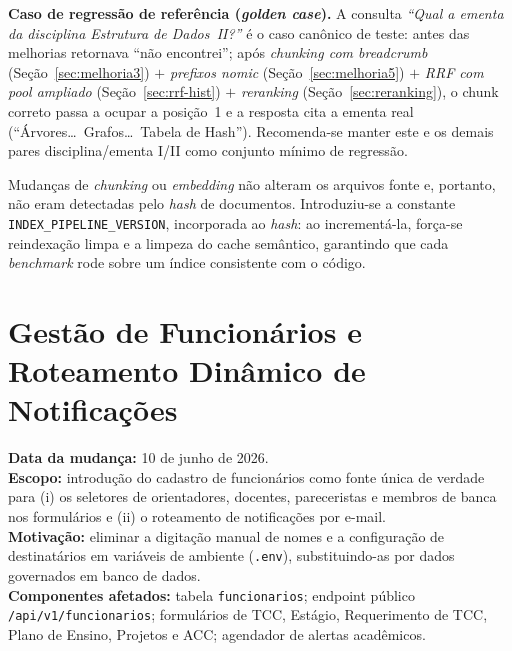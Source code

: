\documentclass[12pt,a4paper]{report}
\begin{document}
\noindent\textbf{Caso de regressão de referência (\textit{golden case}).}
A consulta \textit{``Qual a ementa da disciplina Estrutura de Dados~II?''} é o
caso canônico de teste: antes das melhorias retornava ``não encontrei''; após
\emph{chunking com breadcrumb} (Seção~\ref{sec:melhoria3}) $+$ \emph{prefixos
nomic} (Seção~\ref{sec:melhoria5}) $+$ \emph{RRF com pool ampliado}
(Seção~\ref{sec:rrf-hist}) $+$ \emph{reranking} (Seção~\ref{sec:reranking}), o
chunk correto passa a ocupar a posição~1 e a resposta cita a ementa real
(``Árvores\ldots\ Grafos\ldots\ Tabela de Hash''). Recomenda-se manter este e
os demais pares disciplina/ementa I/II como conjunto mínimo de regressão.

\begin{insight}[title=Reprodutibilidade do índice]
Mudanças de \emph{chunking} ou \emph{embedding} não alteram os arquivos fonte e,
portanto, não eram detectadas pelo \textit{hash} de documentos. Introduziu-se a
constante \texttt{INDEX\_PIPELINE\_VERSION}, incorporada ao \textit{hash}: ao
incrementá-la, força-se reindexação limpa e a limpeza do cache semântico,
garantindo que cada \textit{benchmark} rode sobre um índice consistente com o
código.
\end{insight}

\chapter{Gestão de Funcionários e Roteamento Dinâmico de Notificações}

\begin{controle}
\textbf{Data da mudança:} 10 de junho de 2026.\\
\textbf{Escopo:} introdução do cadastro de funcionários como fonte única de
verdade para (i) os seletores de orientadores, docentes, pareceristas e membros
de banca nos formulários e (ii) o roteamento de notificações por e-mail.\\
\textbf{Motivação:} eliminar a digitação manual de nomes e a configuração de
destinatários em variáveis de ambiente (\texttt{.env}), substituindo-as por
dados governados em banco de dados.\\
\textbf{Componentes afetados:} tabela \texttt{funcionarios}; endpoint público
\texttt{/api/v1/funcionarios}; formulários de TCC, Estágio, Requerimento de TCC,
Plano de Ensino, Projetos e ACC; agendador de alertas acadêmicos.
\end{controle}
\end{document}
